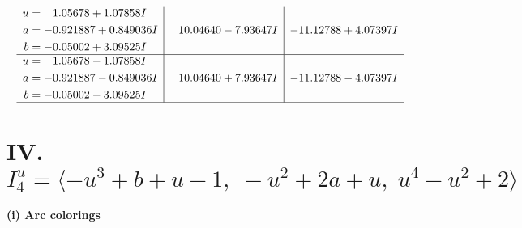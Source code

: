 \documentclass[1p]{elsarticle_modified}
\theoremstyle{definition}
\begin{document}
$$\begin{array}{c|c|c}
\begin{aligned}
u &= \phantom{-}1.05678 + 1.07858 I \\
a &= -0.921887 + 0.849036 I \\
b &= -0.05002 + 3.09525 I\end{aligned}
 & \phantom{-}10.04640 - 7.93647 I & -11.12788 + 4.07397 I \\ \hline\begin{aligned}
u &= \phantom{-}1.05678 - 1.07858 I \\
a &= -0.921887 - 0.849036 I \\
b &= -0.05002 - 3.09525 I\end{aligned}
 & \phantom{-}10.04640 + 7.93647 I & -11.12788 - 4.07397 I\\
 \hline 
 \end{array}$$\newpage\newpage\renewcommand{\arraystretch}{1}
\centering \section*{IV. $I^u_{4}= \langle - u^3+b+u-1,\;- u^2+2 a+u,\;u^4- u^2+2 \rangle$}
\flushleft \textbf{(i) Arc colorings}\\
\end{document}
